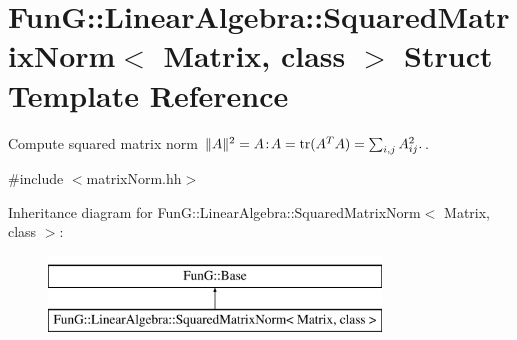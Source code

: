 \hypertarget{structFunG_1_1LinearAlgebra_1_1SquaredMatrixNorm}{\section{Fun\-G\-:\-:Linear\-Algebra\-:\-:Squared\-Matrix\-Norm$<$ Matrix, class $>$ Struct Template Reference}
\label{structFunG_1_1LinearAlgebra_1_1SquaredMatrixNorm}
}


Compute squared matrix norm $ \|A\|^2 = A\negthinspace : \negthinspace A = \mathrm{tr}(A^TA) = \sum_{i,j} A_{ij}^2. $.  




{\ttfamily \#include $<$matrix\-Norm.\-hh$>$}

Inheritance diagram for Fun\-G\-:\-:Linear\-Algebra\-:\-:Squared\-Matrix\-Norm$<$ Matrix, class $>$\-:\begin{figure}[H]
\begin{center}
\leavevmode
\includegraphics[height=2.000000cm]{structFunG_1_1LinearAlgebra_1_1SquaredMatrixNorm}
\end{center}
\end{figure}
